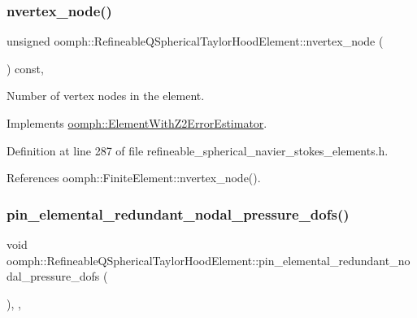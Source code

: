 \subsubsection{\texorpdfstring{nvertex\+\_\+node()}{nvertex\_node()}}
{\footnotesize\ttfamily unsigned oomph\+::\+Refineable\+Q\+Spherical\+Taylor\+Hood\+Element\+::nvertex\+\_\+node (\begin{DoxyParamCaption}{ }\end{DoxyParamCaption}) const\hspace{0.3cm}{\ttfamily [inline]}, {\ttfamily [virtual]}}



Number of vertex nodes in the element. 



Implements \hyperlink{classoomph_1_1ElementWithZ2ErrorEstimator_a19495a0e77ef4ff35f15fdf7913b4077}{oomph\+::\+Element\+With\+Z2\+Error\+Estimator}.



Definition at line 287 of file refineable\+\_\+spherical\+\_\+navier\+\_\+stokes\+\_\+elements.\+h.



References oomph\+::\+Finite\+Element\+::nvertex\+\_\+node().

\mbox{\label{classoomph_1_1RefineableQSphericalTaylorHoodElement_a0aa5d5880b277ae6f4711b54e4b28203}} 
\subsubsection{\texorpdfstring{pin\+\_\+elemental\+\_\+redundant\+\_\+nodal\+\_\+pressure\+\_\+dofs()}{pin\_elemental\_redundant\_nodal\_pressure\_dofs()}}
{\footnotesize\ttfamily void oomph\+::\+Refineable\+Q\+Spherical\+Taylor\+Hood\+Element\+::pin\+\_\+elemental\+\_\+redundant\+\_\+nodal\+\_\+pressure\+\_\+dofs (\begin{DoxyParamCaption}{ }\end{DoxyParamCaption})\hspace{0.3cm}{\ttfamily [inline]}, {\ttfamily [private]}, {\ttfamily [virtual]}}



